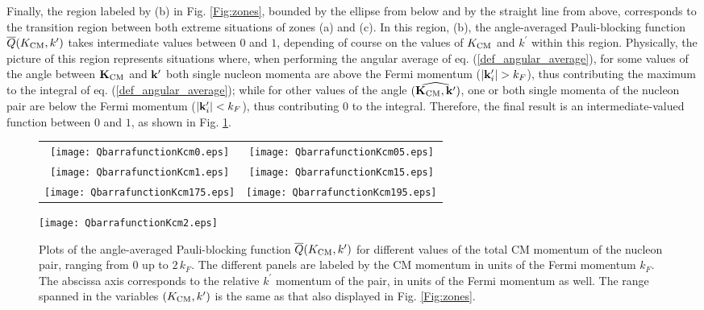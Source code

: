\documentclass[aps,twocolumn,showpacs,preprintnumbers,amsmath,amssymb,nofootinbib,superscriptaddress,showkeys,noeprint]{revtex4-1}
\newcommand{\nk}{{\bf k}}
\newcommand{\nK}{{\bf K}}
\begin{document}
Finally, the region labeled by (b) in Fig. \ref{Fig:zones}, bounded
by the ellipse from below and by the straight line from above,
corresponds to the transition region between both extreme situations
of zones (a) and (c). In this region, (b), the angle-averaged
Pauli-blocking function $\overline{Q}(K_{\rm CM},k^\prime)$ takes
intermediate values between $0$ and $1$, depending of course on the
values of $K_{\rm CM}$ and $k^\prime$ within this region.  Physically,
the picture of this region represents situations where, when
performing the angular average of eq.  (\ref{def_angular_average}),
for some values of the angle between $\nK_{\rm CM}$ and $\nk^\prime$
both single nucleon momenta are above the Fermi momentum
($\left|\nk^\prime_i\right|>k_F$), thus contributing the maximum to
the integral of eq. (\ref{def_angular_average}); while for other
values of the angle $(\widehat{\nK_{\rm CM},\nk^\prime})$, one or both
single momenta of the nucleon pair are below the Fermi momentum
($\left|\nk^\prime_i\right|<k_F$), thus contributing $0$ to the
integral.  Therefore, the final result is an intermediate-valued
function between $0$ and $1$, as shown in Fig. \ref{Fig:Qbarra}.

\begin{figure*}[!ht]
\centering
\begin{tabular}{cc}
\texttt{[image: QbarrafunctionKcm0.eps]}&
\texttt{[image: QbarrafunctionKcm05.eps]}\\
\texttt{[image: QbarrafunctionKcm1.eps]}&
\texttt{[image: QbarrafunctionKcm15.eps]}\\
\texttt{[image: QbarrafunctionKcm175.eps]}&
\texttt{[image: QbarrafunctionKcm195.eps]}\\
\end{tabular}
\texttt{[image: QbarrafunctionKcm2.eps]}
\caption{Plots of the angle-averaged Pauli-blocking function
  $\overline{Q}(K_{\rm CM},k^\prime)$ for different values of the
  total CM momentum of the nucleon pair, ranging from $0$ up to
  $2\,k_F$. The different panels are labeled by the CM momentum in
  units of the Fermi momentum $k_F$. The abscissa axis corresponds to
  the relative $k^\prime$ momentum of the pair, in units of the Fermi
  momentum as well. The range spanned in the variables $(K_{\rm
    CM},k^\prime)$ is the same as that also displayed in
  Fig. \ref{Fig:zones}.}
\label{Fig:Qbarra}
\end{figure*}
\end{document}
